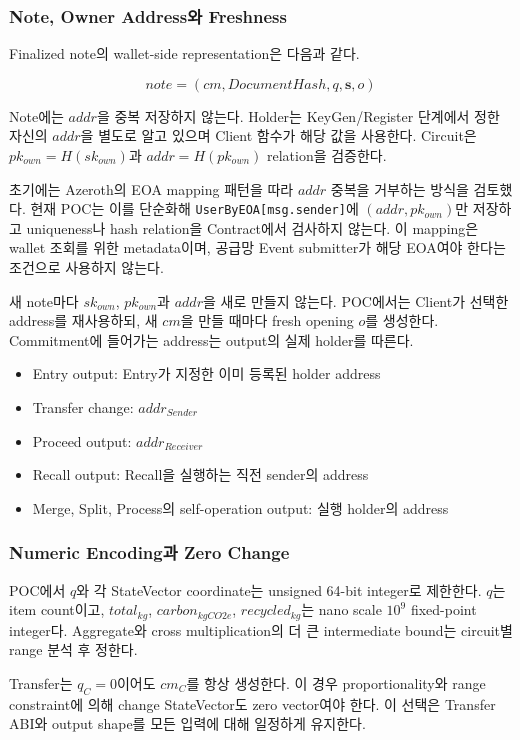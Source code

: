 \documentclass[11pt]{extarticle}
\begin{document}
\subsubsection{Note, Owner Address와 Freshness}

Finalized note의 wallet-side representation은 다음과 같다.

\[
note=(cm,DocumentHash,q,\mathbf{s},o)
\]

Note에는 $addr$을 중복 저장하지 않는다. Holder는 KeyGen/Register 단계에서 정한
자신의 $addr$을 별도로 알고 있으며 Client 함수가 해당 값을 사용한다. Circuit은
$pk_{own}=H(sk_{own})$과 $addr=H(pk_{own})$ relation을 검증한다.

초기에는 Azeroth의 EOA mapping 패턴을 따라 $addr$ 중복을 거부하는 방식을 검토했다.
현재 POC는 이를 단순화해 \texttt{UserByEOA[msg.sender]}에 $(addr,pk_{own})$만 저장하고
uniqueness나 hash relation을 Contract에서 검사하지 않는다. 이 mapping은 wallet 조회를
위한 metadata이며, 공급망 Event submitter가 해당 EOA여야 한다는 조건으로 사용하지 않는다.

새 note마다 $sk_{own}$, $pk_{own}$과 $addr$을 새로 만들지 않는다. POC에서는 Client가
선택한 address를 재사용하되, 새 $cm$을 만들 때마다 fresh opening $o$를 생성한다. Commitment에
들어가는 address는 output의 실제 holder를 따른다.

\begin{itemize}
  \item Entry output: Entry가 지정한 이미 등록된 holder address
  \item Transfer change: $addr_{Sender}$
  \item Proceed output: $addr_{Receiver}$
  \item Recall output: Recall을 실행하는 직전 sender의 address
  \item Merge, Split, Process의 self-operation output: 실행 holder의 address
\end{itemize}

\subsubsection{Numeric Encoding과 Zero Change}

POC에서 $q$와 각 StateVector coordinate는 unsigned 64-bit integer로 제한한다.
$q$는 item count이고, $total_{kg}$, $carbon_{kgCO2e}$, $recycled_{kg}$는
nano scale $10^9$ fixed-point integer다. Aggregate와 cross multiplication의 더 큰
intermediate bound는 circuit별 range 분석 후 정한다.

Transfer는 $q_C=0$이어도 $cm_C$를 항상 생성한다. 이 경우 proportionality와 range
constraint에 의해 change StateVector도 zero vector여야 한다. 이 선택은 Transfer ABI와
output shape를 모든 입력에 대해 일정하게 유지한다.
\end{document}
